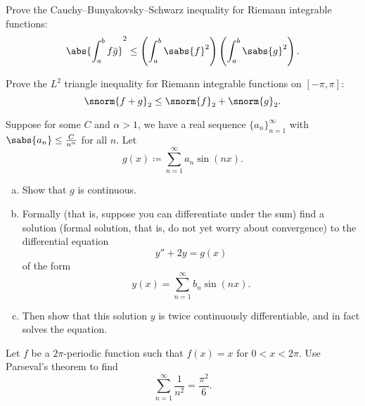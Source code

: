 \begin{exercise} \label{exercise:L2cauchyschwarz}
Prove the Cauchy--Bunyakovsky--Schwarz inequality
for Riemann integrable functions:
\begin{equation*}
{\abs{\int_a^b f\bar{g}}}^2
\leq
\left( \int_a^b \sabs{f}^2 \right)
\left( \int_a^b \sabs{g}^2 \right) .
\end{equation*}
\end{exercise}

\begin{exercise} \label{exercise:L2triangleineq}
Prove the $L^2$ triangle inequality 
for Riemann integrable functions on $[-\pi,\pi]$:
\begin{equation*}
\snorm{f+g}_2 \leq \snorm{f}_2 + \snorm{g}_2 .
\end{equation*}
\end{exercise}

\begin{exercise}
\pagebreak[3]
Suppose for some $C$ and $\alpha > 1$, we have
a real sequence $\{ a_n \}_{n=1}^\infty$ with
$\sabs{a_n} \leq \frac{C}{n^\alpha}$ for all $n$.
Let
\begin{equation*}
g(x) \coloneqq \sum_{n=1}^\infty a_n \sin(n x) .
\end{equation*}
\begin{enumerate}[a)]
\item
Show that $g$ is continuous.
\item
Formally (that is, suppose you can differentiate under the sum)
find a solution (formal solution, that is, do not yet worry about convergence)
to the differential equation
\begin{equation*}
y''+ 2 y = g(x)
\end{equation*}
of the form
\begin{equation*}
y(x) = \sum_{n=1}^\infty b_n \sin(n x) .
\end{equation*}
\item
Then show that this solution $y$ is twice continuously differentiable,
and in fact solves the equation.
\end{enumerate}
\end{exercise}

\begin{exercise}
Let $f$ be a $2\pi$-periodic  function such
that $f(x) = x$ for $0 < x < 2\pi$.
Use Parseval's theorem to find
\begin{equation*}
\sum_{n=1}^\infty \frac{1}{n^2} = \frac{\pi^2}{6} .
\end{equation*}
\end{exercise}

